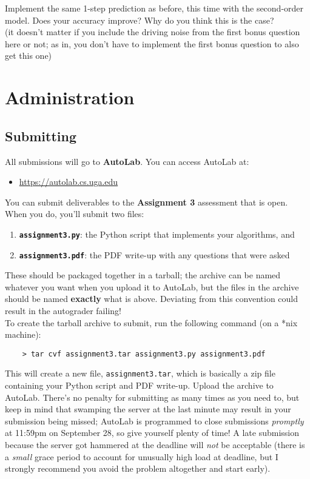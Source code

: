 \documentclass[paper=a4, fontsize=11pt]{scrartcl} %
\numberwithin{figure}{section} %
\numberwithin{table}{section} %
\begin{document}
Implement the same 1-step prediction as before, this time with the second-order model. Does your accuracy improve? Why do you think this is the case? \\

(it doesn't matter if you include the driving noise from the first bonus question here or not; as in, you don't have to implement the first bonus question to also get this one)
   
\section*{Administration}
\setcounter{subsection}{0}

\subsection{Submitting}

All submissions will go to \textbf{AutoLab}. You can access AutoLab at:

\begin{itemize}
	\item \url{https://autolab.cs.uga.edu}
\end{itemize}
	
You can submit deliverables to the \textbf{Assignment 3} assessment that is open. When you do, you'll submit two files:

\begin{enumerate}
	\item \texttt{\textbf{assignment3.py}}: the Python script that implements your algorithms, and
	\item \texttt{\textbf{assignment3.pdf}}: the PDF write-up with any questions that were asked
\end{enumerate}

These should be packaged together in a tarball; the archive can be named whatever you want when you upload it to AutoLab, but the files in the archive should be named \textbf{exactly} what is above. Deviating from this convention could result in the autograder failing! \\

To create the tarball archive to submit, run the following command (on a *nix machine):

\begin{verbatim}
	> tar cvf assignment3.tar assignment3.py assignment3.pdf
\end{verbatim}

This will create a new file, \texttt{assignment3.tar}, which is basically a zip file containing your Python script and PDF write-up. Upload the archive to AutoLab. There's no penalty for submitting as many times as you need to, but keep in mind that swamping the server at the last minute may result in your submission being missed; AutoLab is programmed to close submissions \emph{promptly} at 11:59pm on September 28, so give yourself plenty of time! A late submission because the server got hammered at the deadline will \emph{not} be acceptable (there is a \emph{small} grace period to account for unusually high load at deadline, but I strongly recommend you avoid the problem altogether and start early). \\
\end{document}
